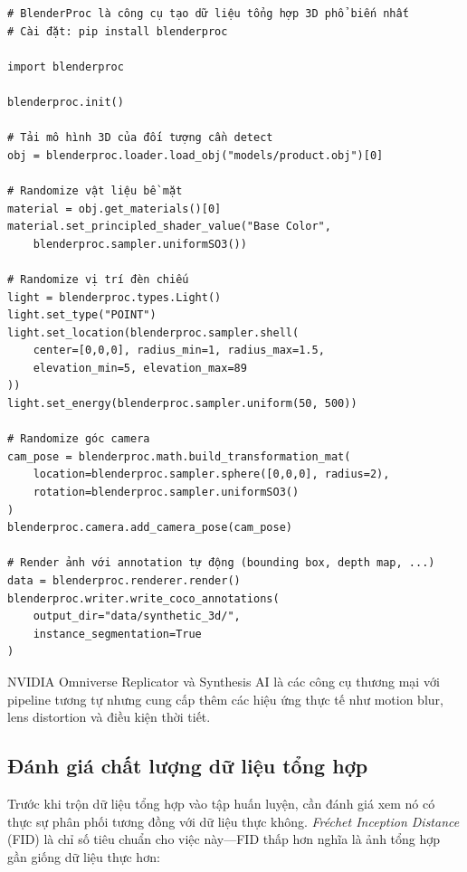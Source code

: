 \begin{verbatim}
# BlenderProc là công cụ tạo dữ liệu tổng hợp 3D phổ biến nhất
# Cài đặt: pip install blenderproc

import blenderproc

blenderproc.init()

# Tải mô hình 3D của đối tượng cần detect
obj = blenderproc.loader.load_obj("models/product.obj")[0]

# Randomize vật liệu bề mặt
material = obj.get_materials()[0]
material.set_principled_shader_value("Base Color",
    blenderproc.sampler.uniformSO3())

# Randomize vị trí đèn chiếu
light = blenderproc.types.Light()
light.set_type("POINT")
light.set_location(blenderproc.sampler.shell(
    center=[0,0,0], radius_min=1, radius_max=1.5,
    elevation_min=5, elevation_max=89
))
light.set_energy(blenderproc.sampler.uniform(50, 500))

# Randomize góc camera
cam_pose = blenderproc.math.build_transformation_mat(
    location=blenderproc.sampler.sphere([0,0,0], radius=2),
    rotation=blenderproc.sampler.uniformSO3()
)
blenderproc.camera.add_camera_pose(cam_pose)

# Render ảnh với annotation tự động (bounding box, depth map, ...)
data = blenderproc.renderer.render()
blenderproc.writer.write_coco_annotations(
    output_dir="data/synthetic_3d/",
    instance_segmentation=True
)
\end{verbatim}

NVIDIA Omniverse Replicator và Synthesis AI là các công cụ thương mại với pipeline tương tự nhưng cung cấp thêm các hiệu ứng thực tế như motion blur, lens distortion và điều kiện thời tiết.

\subsection*{Đánh giá chất lượng dữ liệu tổng hợp}

Trước khi trộn dữ liệu tổng hợp vào tập huấn luyện, cần đánh giá xem nó có thực sự phân phối tương đồng với dữ liệu thực không. \textit{Fréchet Inception Distance} (FID) là chỉ số tiêu chuẩn cho việc này---FID thấp hơn nghĩa là ảnh tổng hợp gần giống dữ liệu thực hơn:

